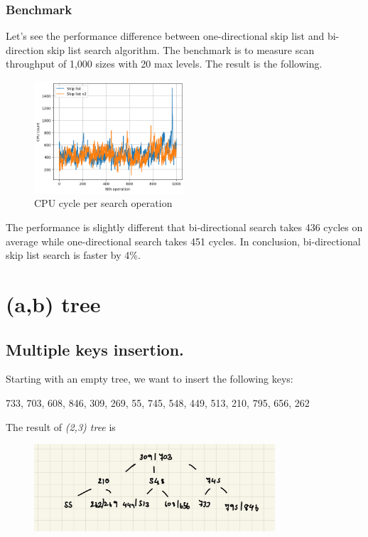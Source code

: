 \documentclass[a4paper, 12pt]{report}
\begin{document}
\subsection{Benchmark}

Let's see the performance difference between one-directional skip list and bi-direction skip list search algorithm.
The benchmark is to measure scan throughput of 1,000 sizes with 20 max levels. The result is the following.

\begin{figure}[h]
        \centering
        \includegraphics[width=0.5\textwidth,scale=0.5]{skip_list_v2_scan.png}
        \caption{\label{fig:skip_list_v2_scan} CPU cycle per search operation}
\end{figure}

The performance is slightly different that bi-directional search takes 436 cycles on average while one-directional search takes
451 cycles. In conclusion, bi-directional skip list search is faster by 4\%.



\chapter{(a,b) tree}

\section{Multiple keys insertion.}

Starting with an empty tree, we want to insert the following keys:
\begin{center}
        733, 703, 608, 846, 309, 269, 55, 745, 548, 449, 513, 210, 795, 656, 262
\end{center}

The result of \emph{(2,3) tree} is

\begin{figure}[h]
        \centering
        \includegraphics[width=0.8\textwidth,scale=0.5]{tree_insertion.jpeg}
\end{figure}
\end{document}
